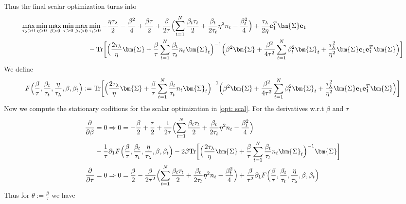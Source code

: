 \documentclass[final]{l4dc2026}
\newcommand{\bSigma}{\bm{\Sigma}}
\newcommand{\be}{\mathbf{e}}
\newcommand{\tr}{\text{Tr}}
\begin{document}
Thus the final scalar optimization turns into
\begin{align} \label{opt: scal}
    \max_{\tau_{\lambda}>0} \min_{\eta > 0} \max_{\beta>0}  \min_{ \tau>0} \max_{\beta_t>0} &\min_{\tau_t>0}  -\frac{\eta \tau_{\lambda}}{2} - \frac{\beta^2}{4} + \frac{\beta \tau}{2}+ \frac{\beta}{2\tau} \Bigl( \sum_{t=1}^N \frac{\beta_t \tau_t}{2} + \frac{\beta_t}{2\tau_t} \eta^2 n_t - \frac{\beta_t^2}{4} \Bigr) +  \frac{\tau_{\lambda}}{2\eta} \be_1^T \bSigma \be_1  \\
     &-\tr \biggl[\Bigl(\frac{2\tau_{\lambda}}{\eta}\bSigma+\frac{\beta}{\tau}\sum_{t=1}^N \frac{\beta_t}{\tau_t} n_t \bSigma_t \Bigr)^{-1} \Bigl(\beta^2 \bSigma + \frac{\beta^2}{4\tau^2} \sum_{t=1}^N \beta^2_t  \bSigma_t  + \frac{\tau_{\lambda}^2}{\eta^2}\bSigma \be_1 \be_1^T \bSigma\Bigr) \biggr]
\end{align}
We define
\begin{align*}
    F\Bigl(\frac{\beta}{\tau}, \frac{\beta_t}{\tau_t}, \frac{\eta}{\tau_{\lambda}}, \beta, \beta_t\Bigr) := \tr \biggl[\Bigl(\frac{2\tau_{\lambda}}{\eta}\bSigma+\frac{\beta}{\tau}\sum_{t=1}^N \frac{\beta_t}{\tau_t} n_t \bSigma_t \Bigr)^{-1} \Bigl(\beta^2 \bSigma + \frac{\beta^2}{4\tau^2} \sum_{t=1}^N \beta^2_t  \bSigma_t  + \frac{\tau_{\lambda}^2}{\eta^2}\bSigma \be_1 \be_1^T \bSigma\Bigr) \biggr]
\end{align*}
Now we compute the stationary coditions for the scalar optimization in \eqref{opt: scal}. For the derivatives w.r.t $\beta$ and $\tau$
\begin{align*}
    \frac{\partial}{\partial \beta} &= 0 \Rightarrow 0 =- \frac{\beta}{2} + \frac{\tau}{2} + \frac{1}{2\tau} \Bigl( \sum_{t=1}^N \frac{\beta_t \tau_t}{2} + \frac{\beta_t}{2\tau_t} \eta^2 n_t - \frac{\beta_t^2}{4}\Bigr) \\
    &- \frac{1}{\tau} \partial_1  F\Bigl(\frac{\beta}{\tau}, \frac{\beta_t}{\tau_t}, \frac{\eta}{\tau_{\lambda}}, \beta, \beta_t\Bigr)  -  2\beta \tr \biggl[\Bigl(\frac{2\tau_{\lambda}}{\eta}\bSigma+\frac{\beta}{\tau}\sum_{t=1}^N \frac{\beta_t}{\tau_t} n_t \bSigma_t \Bigr)^{-1} \bSigma \biggr]\\
     \frac{\partial}{\partial \tau} &= 0 \Rightarrow 0 = \frac{\beta}{2} - \frac{\beta}{2\tau^2} \Bigl( \sum_{t=1}^N \frac{\beta_t \tau_t}{2} + \frac{\beta_t}{2\tau_t} \eta^2 n_t - \frac{\beta_t^2}{4} \Bigr)
     + \frac{\beta}{\tau^2} \partial_1  F\Bigl(\frac{\beta}{\tau}, \frac{\beta_t}{\tau_t}, \frac{\eta}{\tau_{\lambda}}, \beta, \beta_t\Bigr) 
\end{align*}
Thus for $\theta:=\frac{\beta}{\tau}$ we have
\end{document}
